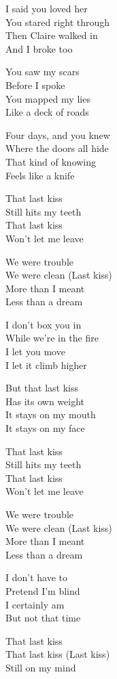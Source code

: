 \begin{lyrics}
I said you loved her\\
You stared right through\\
Then Claire walked in\\
And I broke too

You saw my scars\\
Before I spoke\\
You mapped my lies\\
Like a deck of roads

Four days, and you knew\\
Where the doors all hide\\
That kind of knowing\\
Feels like a knife

That last kiss\\
Still hits my teeth\\
That last kiss\\
Won't let me leave

We were trouble\\
We were clean
(Last kiss)\\
More than I meant\\
Less than a dream

I don't box you in\\
While we're in the fire\\
I let you move\\
I let it climb higher

But that last kiss\\
Has its own weight\\
It stays on my mouth\\
It stays on my face

That last kiss\\
Still hits my teeth\\
That last kiss\\
Won't let me leave

We were trouble\\
We were clean
(Last kiss)\\
More than I meant\\
Less than a dream

I don't have to\\
Pretend I'm blind\\
I certainly am\\
But not that time

That last kiss\\
That last kiss
(Last kiss)\\
Still on my mind
\end{lyrics}

